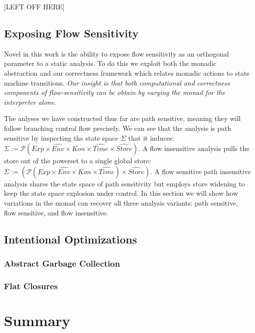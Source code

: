 \documentclass[pldi]{sigplanconf}
\newcommand{\AEnv}{\widehat{Env}}
\newcommand{\ATime}{\widehat{Time}}
\newcommand{\AStore}{\widehat{Store}}
\begin{document}
[LEFT OFF HERE]


\subsection{Exposing Flow Sensitivity}

Novel in this work is the ability to expose flow sensitivity as an orthogonal parameter to a static analysis.
To do this we exploit both the monadic abstraction and our correctness framework which relates monadic actions to state machine transitions.
\emph{Our insight is that both computational and correctness components of flow-sensitivity can be obtain by varying the monad for the interpreter alone.}

The anlyses we have constructed thus far are path sensitive, meaning they will follow branching control flow precisely.
We can see that the analysis is path sensitive by inspecting the state space $Σ$ that it induces: $ Σ := 𝒫 (Exp × \AEnv × Kon × \ATime × \AStore)$.
A flow insensitive analysis pulls the store out of the powerset to a single global store: $Σ := (𝒫 (Exp × \AEnv × Kon × \ATime) × \AStore)$.
A flow sensitive path insensitive analysis shares the state space of path sensitivity but employs store widening to keep the state space explosion under control.
In this section we will show how variations in the monad can recover all three analysis variants: path sensitive, flow sensitive, and flow insensitive.


\subsection{Intentional Optimizations}

\subsubsection{Abstract Garbage Collection}

\subsubsection{Flat Closures}



\section{Summary}
\end{document}
